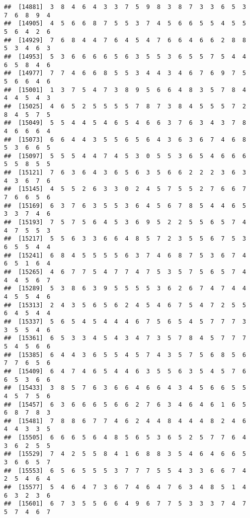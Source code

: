 \documentclass[
]{book}
\begin{document}
\begin{verbatim}
##  [14881]  3  8  4  6  4  3  3  7  5  9  8  3  8  7  3  3  6  5  3  7  6  8  9  4
##  [14905]  4  5  6  6  8  7  5  5  3  7  4  5  6  6  5  5  4  5  5  5  6  4  2  6
##  [14929]  7  6  8  4  4  7  6  4  5  4  7  6  6  4  6  6  2  8  8  5  3  4  6  3
##  [14953]  5  3  6  6  6  6  5  6  3  5  5  3  6  5  5  7  5  4  4  6  5  8  4  6
##  [14977]  7  7  4  6  6  8  5  5  3  4  4  3  4  6  7  6  9  7  5  5  6  6  4  6
##  [15001]  1  3  7  5  4  7  3  8  9  5  6  6  4  8  3  5  7  8  4  4  4  5  4  3
##  [15025]  4  6  5  2  5  5  5  5  7  8  7  3  8  4  5  5  5  7  2  8  4  5  7  5
##  [15049]  5  5  4  4  5  4  6  5  4  6  6  3  7  6  3  4  3  7  8  4  6  6  6  4
##  [15073]  6  6  4  4  3  5  5  6  5  6  4  3  6  3  6  7  4  6  8  5  3  6  6  5
##  [15097]  5  5  5  4  4  7  4  5  3  0  5  5  3  6  5  4  6  6  6  5  5  8  5  5
##  [15121]  7  6  3  6  4  3  6  5  6  3  5  6  6  2  2  2  3  6  3  4  3  6  7  6
##  [15145]  4  5  5  2  6  3  3  0  2  4  5  7  5  5  2  7  6  6  7  7  6  6  5  6
##  [15169]  6  3  7  6  3  5  5  3  6  4  5  6  7  8  5  4  4  6  5  3  3  7  4  6
##  [15193]  7  5  7  5  6  4  5  3  6  9  5  2  2  5  5  6  5  7  4  4  7  5  5  3
##  [15217]  5  5  6  3  3  6  6  4  8  5  7  2  3  5  5  6  7  5  3  6  5  5  4  4
##  [15241]  6  8  4  5  5  5  5  6  3  7  4  6  8  7  5  3  6  7  4  6  5  1  6  4
##  [15265]  4  6  7  7  5  4  7  7  4  7  5  3  5  7  5  6  5  7  4  4  4  5  6  7
##  [15289]  5  3  8  6  3  9  5  5  5  5  3  6  2  6  7  4  7  4  4  4  5  5  4  6
##  [15313]  2  4  3  5  6  5  6  2  4  5  4  6  7  5  4  7  2  5  5  6  4  5  4  4
##  [15337]  5  6  5  4  5  4  4  4  6  7  5  6  5  4  5  7  7  7  3  3  5  5  4  6
##  [15361]  6  5  3  3  4  5  4  3  4  7  3  5  7  8  4  5  7  7  7  5  4  5  6  6
##  [15385]  6  4  4  3  6  5  5  4  5  7  4  3  5  7  5  6  8  5  6  7  7  6  5  6
##  [15409]  6  4  7  4  6  5  4  4  6  3  5  5  6  3  5  4  5  7  6  6  5  3  6  6
##  [15433]  3  8  5  7  6  3  6  6  4  6  6  4  3  4  5  6  6  5  5  4  5  7  5  6
##  [15457]  6  3  6  6  6  5  6  6  2  7  6  3  4  6  4  6  1  6  5  6  8  7  8  3
##  [15481]  7  8  8  6  7  7  4  6  2  4  4  8  4  4  4  8  2  4  6  4  4  3  3  5
##  [15505]  6  6  6  5  6  4  8  5  6  5  3  6  5  2  5  7  7  6  4  3  6  2  5  5
##  [15529]  7  4  2  5  5  8  4  1  6  8  8  3  5  4  6  4  6  6  5  3  6  6  5  7
##  [15553]  6  5  6  5  5  5  3  7  7  7  5  5  4  3  3  6  6  7  4  2  5  4  6  4
##  [15577]  5  4  6  4  7  3  6  7  4  6  4  7  6  3  4  8  5  1  4  6  3  2  3  6
##  [15601]  6  7  3  5  5  6  6  4  9  6  7  7  5  3  3  3  7  4  7  5  7  4  6  7

\end{verbatim}
\end{document}
